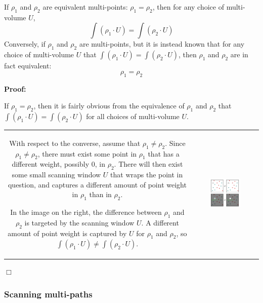 \begin{thm}\label{thm:scanning_points}
If \(\rho_1\) and \(\rho_2\) are equivalent multi-points: \(\rho_1 = \rho_2\), then for any choice of multi-volume \(U\), 
\[\int (\rho_1 \cdot U) = \int (\rho_2 \cdot U)\]
Conversely, if \(\rho_1\) and \(\rho_2\) are multi-points, but it is instead known that for any choice of multi-volume \(U\) that 
\(\int (\rho_1 \cdot U) = \int (\rho_2 \cdot U)\), then \(\rho_1\) and \(\rho_2\) are in fact equivalent:
\[\rho_1 = \rho_2\]  
\end{thm}
\textbf{Proof:}

If \(\rho_1 = \rho_2\), then it is fairly obvious from the equivalence of \(\rho_1\) and \(\rho_2\) that \(\int (\rho_1 \cdot U) = \int (\rho_2 \cdot U)\) for all choices of multi-volume \(U\). 

\begin{tabular}{cc}
\parbox{0.5\textwidth}{
With respect to the converse, assume that \(\rho_1 \neq \rho_2\). Since \(\rho_1 \neq \rho_2\), there must exist some point in \(\rho_1\) that has a different weight, possibly \(0\), in \(\rho_2\). There will then exist some small scanning window \(U\) that wraps the point in question, and captures a different amount of point weight in \(\rho_1\) than in \(\rho_2\).

In the image on the right, the difference between \(\rho_1\) and \(\rho_2\) is targeted by the scanning window \(U\). A different amount of point weight is captured by \(U\) for \(\rho_1\) and \(\rho_2\), so \(\int (\rho_1 \cdot U) \neq \int (\rho_2 \cdot U)\).
} & \parbox{0.5\textwidth}{
\includegraphics[width = 0.5\textwidth]{Point_totals/scanning_points_using_volumes}
}
\end{tabular}

\(\Box\)

\subsubsection{Scanning multi-paths}

